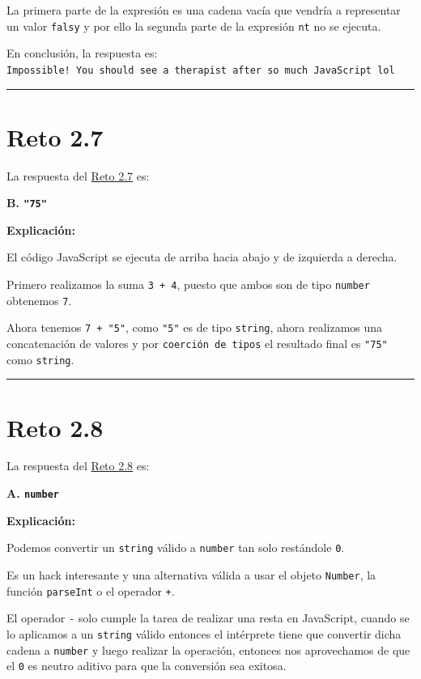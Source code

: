 \documentclass[
  letterpaper,
  DIV=11,
  numbers=noendperiod]{scrreprt}
\begin{document}
La primera parte de la expresión es una cadena vacía que vendría a
representar un valor \texttt{falsy} y por ello la segunda parte de la
expresión \texttt{n\textquotesingle{}t} no se ejecuta.

En conclusión, la respuesta es:
\texttt{Impossible!\ You\ should\ see\ a\ therapist\ after\ so\ much\ JavaScript\ lol}

\begin{center}\rule{0.5\linewidth}{0.5pt}\end{center}

\section{Reto 2.7}\label{sec-sol-cap2-reto7}

La respuesta del \hyperref[sec-cap2-reto7]{Reto 2.7} es:

\textbf{B. \texttt{"75"}}

\textbf{Explicación:}

El código JavaScript se ejecuta de arriba hacia abajo y de izquierda a
derecha.

Primero realizamos la suma \texttt{3\ +\ 4}, puesto que ambos son de
tipo \texttt{number} obtenemos \texttt{7}.

Ahora tenemos \texttt{7\ +\ "5"}, como \texttt{"5"} es de tipo
\texttt{string}, ahora realizamos una concatenación de valores y por
\texttt{coerción\ de\ tipos} el resultado final es \texttt{"75"} como
\texttt{string}.

\begin{center}\rule{0.5\linewidth}{0.5pt}\end{center}

\section{Reto 2.8}\label{sec-sol-cap2-reto8}

La respuesta del \hyperref[sec-cap2-reto8]{Reto 2.8} es:

\textbf{A. \texttt{number}}

\textbf{Explicación:}

Podemos convertir un \texttt{string} válido a \texttt{number} tan solo
restándole \texttt{0}.

Es un hack interesante y una alternativa válida a usar el objeto
\texttt{Number}, la función \texttt{parseInt} o el operador \texttt{+}.

El operador \texttt{-} solo cumple la tarea de realizar una resta en
JavaScript, cuando se lo aplicamos a un \texttt{string} válido entonces
el intérprete tiene que convertir dicha cadena a \texttt{number} y luego
realizar la operación, entonces nos aprovechamos de que el \texttt{0} es
neutro aditivo para que la conversión sea exitosa.
\end{document}
